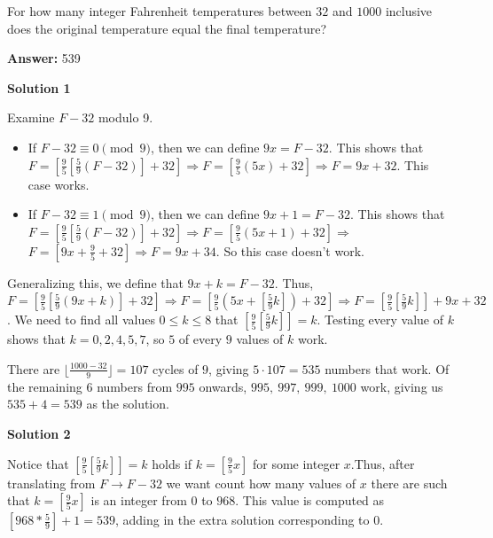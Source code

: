 \begin{enumerate}
 For how many integer Fahrenheit temperatures between $32$ and $1000$ inclusive does the original temperature equal the final temperature?


 
 \textbf{Answer: }539



\textbf{Solution 1}

Examine $F - 32$ modulo 9.

 
            \begin{itemize}
        \item If $F - 32 \equiv 0 \pmod{9}$, then we can define $9x = F - 32$. This shows that $F = \left[\frac{9}{5}\left[\frac{5}{9}(F-32)\right] + 32\right] \Longrightarrow F = \left[\frac{9}{5}(5x) + 32\right] \Longrightarrow F = 9x + 32$. This case works.
        \item If $F - 32 \equiv 1 \pmod{9}$, then we can define $9x + 1 = F - 32$. This shows that $F = \left[\frac{9}{5}\left[\frac{5}{9}(F-32)\right] + 32\right] \Longrightarrow F = \left[\frac{9}{5}(5x + 1) + 32\right] \Longrightarrow$$F = \left[9x + \frac{9}{5}+ 32 \right] \Longrightarrow F = 9x + 34$. So this case doesn't work.
            \end{itemize}
            Generalizing this, we define that $9x + k = F - 32$. Thus, $F = \left[\frac{9}{5}\left[\frac{5}{9}(9x + k)\right] + 32\right] \Longrightarrow F = \left[\frac{9}{5}(5x + \left[\frac{5}{9}k\right]) + 32\right] \Longrightarrow F = \left[\frac{9}{5} \left[\frac{5}{9}k \right] \right] + 9x + 32$. We need to find all values $0 \le k \le 8$ that $\left[ \frac{9}{5} \left[ \frac{5}{9} k \right] \right] = k$. Testing every value of $k$ shows that $k = 0, 2, 4, 5, 7$, so $5$ of every $9$ values of $k$ work.

 There are $\lfloor \frac{1000 - 32}{9} \rfloor = 107$ cycles of $9$, giving $5 \cdot 107 = 535$ numbers that work. Of the remaining $6$ numbers from $995$ onwards, $995,\ 997,\ 999,\ 1000$ work, giving us $535 + 4 = \boxed{539}$ as the solution.

 



\textbf{Solution 2}

Notice that $\left[ \frac{9}{5} \left[ \frac{5}{9} k \right] \right] = k$ holds if $k=\left[ \frac{9}{5}x\right]$ for some integer $x$.Thus, after translating from $F\to F-32$ we want count how many values of $x$ there are such that $k=\left[ \frac{9}{5}x\right]$ is an integer from $0$ to $968$. This value is computed as $\left[968*\frac{5}{9}\right]+1 = \boxed{539}$, adding in the extra solution corresponding to $0$.


\end{enumerate}

